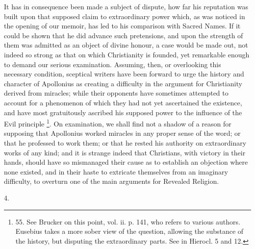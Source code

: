It has in consequence been
made a subject of dispute, how far his reputation was built upon that
supposed claim to extraordinary power which, as was noticed in the
opening of our memoir, has led to his comparison with Sacred Names. If
it could be shown that he did advance such pretensions, and upon the
strength of them was admitted as an object of divine honour, a case
would be made out, not indeed so strong as that on which Christianity
is founded, yet remarkable enough to demand our serious examination.
Assuming, then, or overlooking this necessary condition, sceptical
writers have been forward to urge the history and character of
Apollonius as creating a difficulty in the argument for Christianity
derived from miracles; while their opponents have sometimes attempted
to account for a phenomenon of which they had not yet ascertained the
existence, and have most gratuitously ascribed his supposed power to
the influence of the Evil principle \footnote{55.
See Brucker on this point, vol. ii. p. 141, who refers to various
authors. Eusebius takes a more sober view of the question, allowing
the substance of the history, but disputing the extraordinary parts.
See in Hierocl. 5 and 12.}. On examination, we shall find
not a shadow of a reason for supposing that Apollonius worked miracles
in any proper sense of the word; or that he professed to work them; or
that he rested his authority on extraordinary works of any kind; and
it is strange indeed that Christians, with victory in their hands,
should have so mismanaged their cause as to establish an objection
where none existed, and in their haste to extricate themselves from an
imaginary difficulty, to overturn one of the main arguments for
Revealed Religion.

4.

